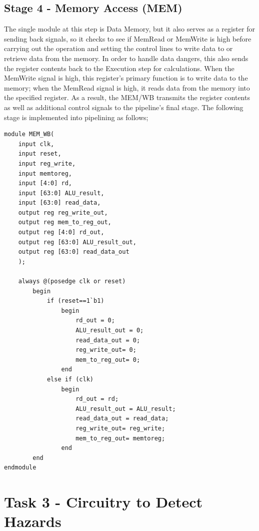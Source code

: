 \documentclass{article}
\begin{document}
\subsection{Stage 4 - Memory Access (MEM)}

The single module at this step is Data Memory, but it also serves as a register for sending back signals, so it checks to see if MemRead or MemWrite is high before carrying out the operation and setting the control lines to write data to or retrieve data from the memory. In order to handle data dangers, this also sends the register contents back to the Execution step for calculations. When the MemWrite signal is high, this register's primary function is to write data to the memory; when the MemRead signal is high, it reads data from the memory into the specified register. As a result, the MEM/WB transmits the register contents as well as additional control signals to the pipeline's final stage. The following stage is implemented into pipelining as follows;

\begin{lstlisting}[caption={MEM/WB Register}, captionpos=b, language=RISC-V]
module MEM_WB(
    input clk,
    input reset,
    input reg_write,
    input memtoreg,
    input [4:0] rd,
    input [63:0] ALU_result,
    input [63:0] read_data,
    output reg reg_write_out,
    output reg mem_to_reg_out,
    output reg [4:0] rd_out,
    output reg [63:0] ALU_result_out,
    output reg [63:0] read_data_out 
    );
       
    always @(posedge clk or reset)
        begin
            if (reset==1`b1)
                begin
                    rd_out = 0;
                    ALU_result_out = 0;
                    read_data_out = 0;
                    reg_write_out= 0;
                    mem_to_reg_out= 0;            	
                end
            else if (clk)
                begin
                    rd_out = rd;
                    ALU_result_out = ALU_result;
                    read_data_out = read_data;
                    reg_write_out= reg_write;
                    mem_to_reg_out= memtoreg;            	
                end
        end        
endmodule
\end{lstlisting}

\newpage

\section{Task 3 - Circuitry to Detect Hazards}
\end{document}
